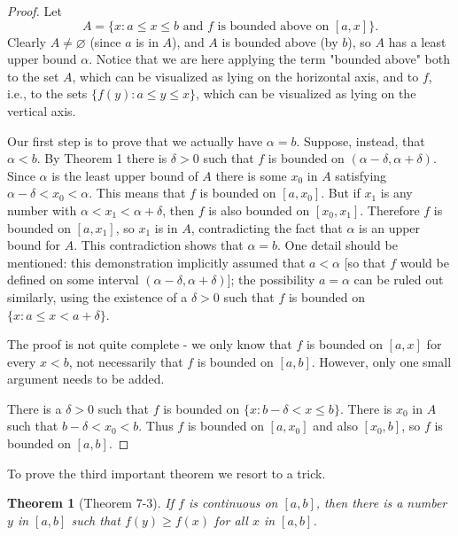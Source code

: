 \documentclass{article}
\newtheorem*{theorem*}{Theorem}
\begin{document}
\begin{proof}
  Let \begin{equation*}
    A = \{x: a \leq x \leq b \text{ and } f \text{ is bounded above on } [a,
      x]\}.
  \end{equation*}
  Clearly $A \neq \varnothing$ (since $a$ is in $A$), and $A$ is bounded above
  (by $b$), so $A$ has a least upper bound $\alpha$. Notice that we are here
  applying the term "bounded above" both to the set $A$, which can be
  visualized as lying on the horizontal axis, and to $f$, i.e., to the sets
  $\{f(y): a \leq y \leq x\}$, which can be visualized as lying on the vertical
  axis.

  Our first step is to prove that we actually have $\alpha = b$. Suppose,
  instead, that $\alpha < b$. By Theorem 1 there is $\delta > 0$ such that $f$
  is bounded on $(\alpha - \delta, \alpha + \delta)$. Since $\alpha$ is the
  least upper bound of $A$ there is some $x_0$ in $A$ satisfying $\alpha -
  \delta < x_0 < \alpha$. This means that $f$ is bounded on $[a, x_0]$. But if
  $x_1$ is any number with $\alpha < x_1 < \alpha + \delta$, then $f$ is also
  bounded on $[x_0, x_1]$. Therefore $f$ is bounded on $[a, x_1]$, so $x_1$ is
  in $A$, contradicting the fact that $\alpha$ is an upper bound for $A$. This
  contradiction shows that $\alpha = b$. One detail should be mentioned: this
  demonstration implicitly assumed that $a < \alpha$ [so that $f$ would be
  defined on some interval $(\alpha - \delta, \alpha + \delta)$]; the
  possibility $a = \alpha$ can be ruled out similarly, using the existence of a
  $\delta > 0$ such that $f$ is bounded on $\{x: a \leq x < a + \delta\}$.

  The proof is not quite complete - we only know that $f$ is bounded on $[a,
  x]$ for every $x < b$, not necessarily that $f$ is bounded on $[a, b]$.
  However, only one small argument needs to be added.

  There is a $\delta > 0$ such that $f$ is bounded on $\{x: b - \delta < x \leq
  b\}$. There is $x_0$ in $A$ such that $b - \delta < x_0 < b$. Thus $f$ is
  bounded on $[a, x_0]$ and also $[x_0, b]$, so $f$ is bounded on $[a, b]$.
\end{proof}

To prove the third important theorem we resort to a trick.

\begin{theorem*}[Theorem 7-3]
  If $f$ is continuous on $[a, b]$, then there is a number $y$ in $[a, b]$ such
  that $f(y) \geq f(x)$ for all $x$ in $[a, b]$.
\end{theorem*}
\end{document}
